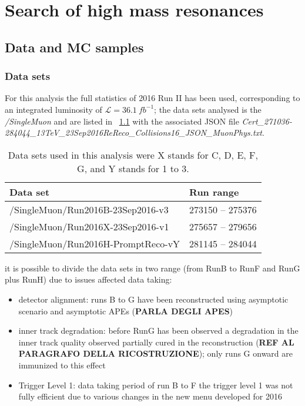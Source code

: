 \chapter{Search of high mass resonances}
\label{Chapter4}

\section{Data and MC samples}
\subsection{Data sets}
For this analysis the full statistics of 2016 Run II has been used, corresponding to an integrated luminosity of $\mathcal{L} = 36.1~fb^{-1}$; the data sets analysed is the \textit{/SingleMuon} and are listed in ~\ref{table:Datasets} with the associated JSON file \textit{Cert\_271036-284044\_13TeV\_23Sep2016ReReco\_Collisions16\_JSON\_MuonPhys.txt}.
\begin{table}[htb!]
\begin{center}
\begin{tabular}{|l|l|} \hline
 Data set                              & Run range        \\ \hline \hline
/SingleMuon/Run2016B-23Sep2016-v3      & 273150 -- 275376 \\ \hline
/SingleMuon/Run2016X-23Sep2016-v1      & 275657 -- 279656 \\ \hline
/SingleMuon/Run2016H-PromptReco-vY     & 281145 -- 284044 \\ \hline
\end{tabular}
\caption{Data sets used in this analysis were X stands for C, D, E, F, G, and Y stands for 1 to 3.}
\label{table:Datasets}
\end{center}
\end{table}
it is possible to divide the data sets in two range (from RunB to RunF and RunG plus  RunH) due to issues affected data taking:
\begin{itemize}
\item detector alignment: runs B to G have been reconstructed using asymptotic scenario and asymptotic APEs (\textbf{PARLA DEGLI APES})
\item inner track degradation: before RunG has been observed a degradation in the inner track quality observed partially cured in the reconstruction (\textbf{REF AL PARAGRAFO DELLA RICOSTRUZIONE}); only runs G onward are immunized to this effect 
\item Trigger Level 1: data taking period of run B to F the trigger level 1 was not fully efficient due to various changes in the new menu developed for 2016
\end{itemize}
